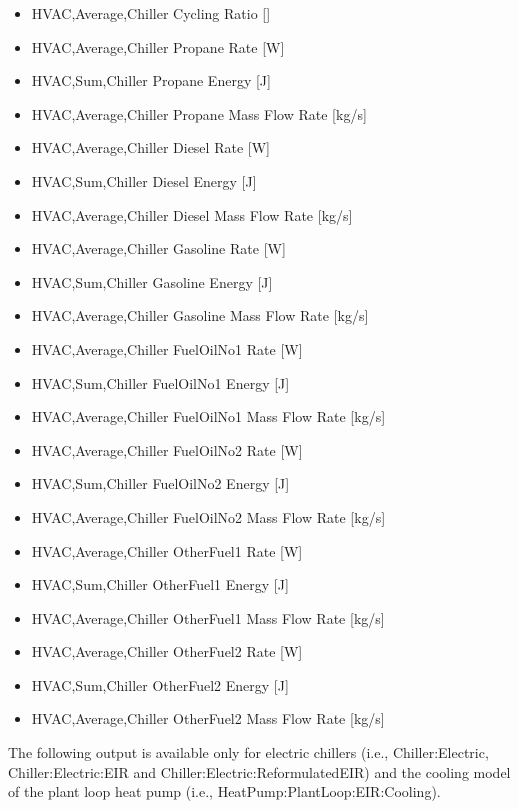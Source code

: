 \begin{itemize}
    \item
    HVAC,Average,Chiller Cycling Ratio {[]}
    \item
    HVAC,Average,Chiller Propane Rate {[}W{]}
    \item
    HVAC,Sum,Chiller Propane Energy {[}J{]}
    \item
    HVAC,Average,Chiller Propane Mass Flow Rate {[}kg/s{]}
    \item
    HVAC,Average,Chiller Diesel Rate {[}W{]}
    \item
    HVAC,Sum,Chiller Diesel Energy {[}J{]}
    \item
    HVAC,Average,Chiller Diesel Mass Flow Rate {[}kg/s{]}
    \item
    HVAC,Average,Chiller Gasoline Rate {[}W{]}
    \item
    HVAC,Sum,Chiller Gasoline Energy {[}J{]}
    \item
    HVAC,Average,Chiller Gasoline Mass Flow Rate {[}kg/s{]}
    \item
    HVAC,Average,Chiller FuelOilNo1 Rate {[}W{]}
    \item
    HVAC,Sum,Chiller FuelOilNo1 Energy {[}J{]}
    \item
    HVAC,Average,Chiller FuelOilNo1 Mass Flow Rate {[}kg/s{]}
    \item
    HVAC,Average,Chiller FuelOilNo2 Rate {[}W{]}
    \item
    HVAC,Sum,Chiller FuelOilNo2 Energy {[}J{]}
    \item
    HVAC,Average,Chiller FuelOilNo2 Mass Flow Rate {[}kg/s{]}
    \item
    HVAC,Average,Chiller OtherFuel1 Rate {[}W{]}
    \item
    HVAC,Sum,Chiller OtherFuel1 Energy {[}J{]}
    \item
    HVAC,Average,Chiller OtherFuel1 Mass Flow Rate {[}kg/s{]}
    \item
    HVAC,Average,Chiller OtherFuel2 Rate {[}W{]}
    \item
    HVAC,Sum,Chiller OtherFuel2 Energy {[}J{]}
    \item
    HVAC,Average,Chiller OtherFuel2 Mass Flow Rate {[}kg/s{]}
\end{itemize}

The following output is available only for electric chillers (i.e., Chiller:Electric, Chiller:Electric:EIR and Chiller:Electric:ReformulatedEIR) and the cooling model of the plant loop heat pump (i.e., HeatPump:PlantLoop:EIR:Cooling).

